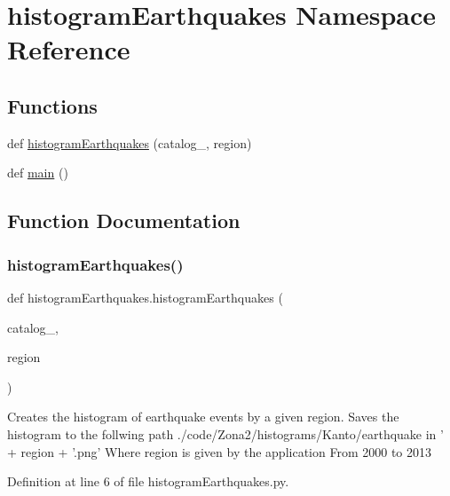 \hypertarget{namespacehistogram_earthquakes}{}\section{histogram\+Earthquakes Namespace Reference}
\label{namespacehistogram_earthquakes}
\subsection*{Functions}
\begin{DoxyCompactItemize}
\item 
def \hyperlink{namespacehistogram_earthquakes_a08169c3c6b725c0bd8387b21d2a2c045}{histogram\+Earthquakes} (catalog\+\_\+, region)
\item 
def \hyperlink{namespacehistogram_earthquakes_a212707dd671ef5dee3990d80d54f337d}{main} ()
\end{DoxyCompactItemize}


\subsection{Function Documentation}
\mbox{\label{namespacehistogram_earthquakes_a08169c3c6b725c0bd8387b21d2a2c045}} 
\subsubsection{\texorpdfstring{histogram\+Earthquakes()}{histogramEarthquakes()}}
{\footnotesize\ttfamily def histogram\+Earthquakes.\+histogram\+Earthquakes (\begin{DoxyParamCaption}\item[{}]{catalog\+\_\+,  }\item[{}]{region }\end{DoxyParamCaption})}

\begin{DoxyVerb}Creates the histogram of earthquake events by a given region.
Saves the histogram to the follwing path ./code/Zona2/histograms/Kanto/earthquake in ' + region + '.png'
Where region is given by the application
From 2000 to 2013
\end{DoxyVerb}
 

Definition at line 6 of file histogram\+Earthquakes.\+py.

